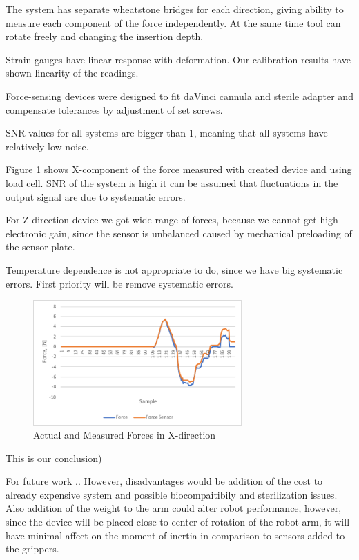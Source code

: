 	 The system has separate wheatstone bridges for each direction, giving ability to measure each component of the force independently. At the same time tool can rotate freely and changing the insertion depth.	
	
	Strain gauges have linear response with deformation. Our calibration results have shown linearity of the readings.

	Force-sensing devices were designed to fit daVinci cannula and sterile adapter and compensate tolerances by adjustment of set screws.

SNR values for all systems are bigger than 1, meaning that all systems have relatively low noise.

Figure \ref{fig:Syst_err} shows X-component of the force measured with created device and using load cell. SNR of the system is high  it can be assumed that fluctuations in the output signal are due to systematic errors. 

For Z-direction device we got wide range of forces, because we cannot get high electronic gain, since the sensor is unbalanced caused by mechanical preloading of the sensor plate.

Temperature dependence is not appropriate to do, since we have big systematic errors. First priority will be remove systematic errors.

\begin{figure}[h]
	\begin{center}
	\includegraphics[width=80mm]{fig/results/syst_error.pdf}
	\end{center}
	\vspace{-4mm}
	\caption[Actual and Measured Forces in X-direction]
	{Actual and Measured Forces in X-direction}
	\label{fig:Syst_err}
	\vspace{-2mm}
\end{figure}

This is our conclusion)

For future work ..
However, disadvantages would be addition of the cost to already expensive system and possible biocompaitibily and sterilization issues. Also addition of the weight to the arm could alter robot performance, however, since the device will be placed close to center of rotation of the robot arm, it will have minimal affect on the moment of inertia  in comparison to sensors added to the grippers.


